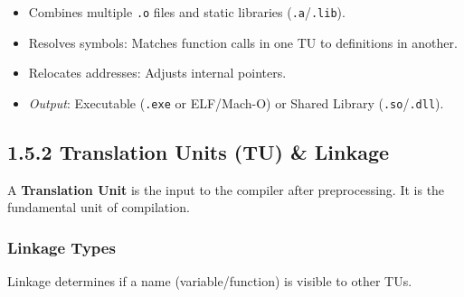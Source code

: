 \begin{enumerate}
  \begin{itemize}
  \tightlist
  \item
    Combines multiple \passthrough{\lstinline!.o!} files and static
    libraries
    (\passthrough{\lstinline!.a!}/\passthrough{\lstinline!.lib!}).
  \item
    Resolves symbols: Matches function calls in one TU to definitions in
    another.
  \item
    Relocates addresses: Adjusts internal pointers.
  \item
    \emph{Output}: Executable (\passthrough{\lstinline!.exe!} or
    ELF/Mach-O) or Shared Library
    (\passthrough{\lstinline!.so!}/\passthrough{\lstinline!.dll!}).
  \end{itemize}
\end{enumerate}

\hypertarget{translation-units-tu-linkage}{%
\subsection{1.5.2 Translation Units (TU) \&
Linkage}\label{translation-units-tu-linkage}}

A \textbf{Translation Unit} is the input to the compiler after
preprocessing. It is the fundamental unit of compilation.

\hypertarget{linkage-types}{%
\subsubsection{Linkage Types}\label{linkage-types}}

Linkage determines if a name (variable/function) is visible to other
TUs.

